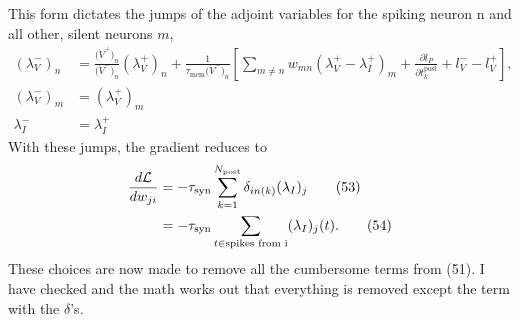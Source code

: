 \documentclass[a4paper]{article}
\newcommand{\blue}[1]{{\color{blue}#1}}
\begin{document}
\blue{
  This form dictates the jumps of the adjoint variables for the
  spiking neuron n and all other, silent neurons $m$,
  \begin{align}
    (\lambda^-_V)_n &= \frac{\big( \dot{V}^+
      \big)_n}{\big(\dot{V}^-\big)_n} (\lambda_V^+)_n +
      \frac{1}{\tau_{\text{mem}} \big(\dot{V}^-\big)_n} \left[
        \sum_{m \neq n} w_{mn} (\lambda^+_V - \lambda^+_I)_m +
        \frac{\partial l_P}{\partial t_k^{\text{post}}} + l^-_V -
        l^+_V \right] , \tag{52a} \\
      (\lambda^-_V)_m &= (\lambda^+_V)_m \tag{52b} \\
      \lambda_I^- &= \lambda_I^+ \tag{52c}
  \end{align}
  With these jumps, the gradient reduces to
  \begin{align}
    \frac{d \cal L}{d w_{ji}} &= -\tau_{\text{syn}}
    \sum_{k=1}^{N_{\text{post}}} \delta_{in(k)} (\lambda_I)_j \tag{53}
    \\
    &= -\tau_{\text{syn}} \sum_{t \in \text{spikes from i}}
      (\lambda_I)_j(t) . \tag{54}
  \end{align}
}
These choices are now made to remove all the cumbersome terms from
\blue{(51)}. I have checked and the math works out that everything
is removed except the term with the $\delta$'s.
\end{document}
